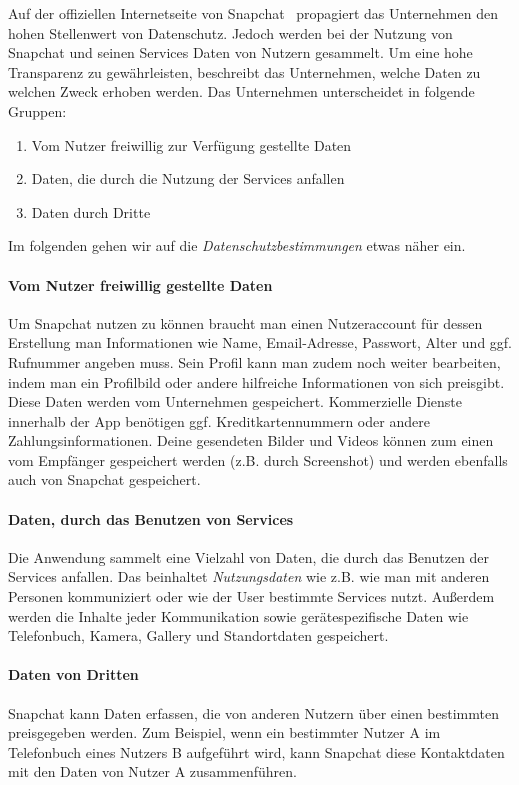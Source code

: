 Auf der offiziellen Internetseite von Snapchat~\cite{snap_site} propagiert das
Unternehmen den hohen Stellenwert von Datenschutz. Jedoch werden bei der
Nutzung von Snapchat und seinen Services Daten von Nutzern gesammelt. Um eine
hohe Transparenz zu gew\"ahrleisten, beschreibt das Unternehmen, welche Daten
zu welchen Zweck erhoben werden. Das Unternehmen unterscheidet in folgende Gruppen:
\begin{enumerate}
	\item Vom Nutzer freiwillig zur Verf\"ugung gestellte Daten
	\item Daten, die durch die Nutzung der Services anfallen
	\item Daten durch Dritte
\end{enumerate}
Im folgenden gehen wir auf die \emph{Datenschutzbestimmungen} etwas
n\"aher ein.

\paragraph{Vom Nutzer freiwillig gestellte Daten}
Um Snapchat nutzen zu k\"onnen braucht man einen Nutzeraccount f\"ur dessen
Erstellung man Informationen wie Name, Email-Adresse, Passwort, Alter und ggf.
Rufnummer angeben muss. Sein Profil kann man zudem noch weiter bearbeiten,
indem man ein Profilbild oder andere hilfreiche Informationen von sich
preisgibt. Diese Daten werden vom Unternehmen gespeichert. Kommerzielle Dienste
innerhalb der App ben\"otigen ggf.  Kreditkartennummern oder andere
Zahlungsinformationen. Deine gesendeten Bilder und Videos k\"onnen zum einen
vom Empf\"anger gespeichert werden (z.B. durch Screenshot) und werden ebenfalls
auch von Snapchat gespeichert.

\paragraph{Daten, durch das Benutzen von Services}
Die Anwendung sammelt eine Vielzahl von Daten, die durch das Benutzen der
Services anfallen. Das beinhaltet \emph{Nutzungsdaten} wie z.B. wie man mit
anderen Personen kommuniziert oder wie der User bestimmte Services nutzt.
Au{\ss}erdem werden die Inhalte jeder Kommunikation sowie ger\"atespezifische
Daten wie Telefonbuch, Kamera, Gallery und Standortdaten gespeichert.

\paragraph{Daten von Dritten}
Snapchat kann Daten erfassen, die von anderen Nutzern \"uber einen bestimmten
preisgegeben werden. Zum Beispiel, wenn ein bestimmter Nutzer A im Telefonbuch
eines Nutzers B aufgef\"uhrt wird, kann Snapchat diese Kontaktdaten mit den
Daten von Nutzer A zusammenf\"uhren.

